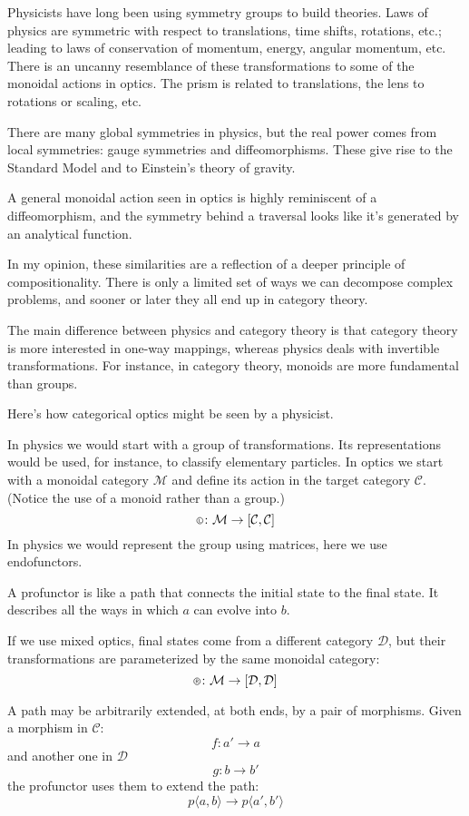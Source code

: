\documentclass[11pt]{amsart}
\newcommand*\circled[3]
  {\tikz[baseline={([yshift=#2]current bounding box.center)}]{
      \node[shape=circle,draw,inner sep=#1] (char) {#3};}}
\newcommand{\actL}{\mathbin{\circled{0.5pt}{-0.55ex}{\scalebox{0.75}{\tiny{$\mathsf{L}$}}}}}
\newcommand{\actR}{\mathbin{\circled{0.5pt}{-0.55ex}{\scalebox{0.75}{\tiny{$\mathsf{R}$}}}}}
\begin{document}
Physicists have long been using symmetry groups to build theories. Laws of physics are symmetric with respect to translations, time shifts, rotations, etc.; leading to laws of conservation of momentum, energy, angular momentum, etc. There is an uncanny resemblance of these transformations to some of the monoidal actions in optics. The prism is related to translations, the lens to rotations or scaling, etc.

There are many global symmetries in physics, but the real power comes from local symmetries: gauge symmetries and diffeomorphisms. These give rise to the Standard Model and to Einstein's theory of gravity. 

A general monoidal action seen in optics is highly reminiscent of a diffeomorphism, and the symmetry behind a traversal looks like it's generated by an analytical function.

In my opinion, these similarities are a reflection of a deeper principle of compositionality. There is only a limited set of ways we can decompose complex problems, and sooner or later they all end up in category theory. 

The main difference between physics and category theory is that category theory is more interested in one-way mappings, whereas physics deals with invertible transformations. For instance, in category theory, monoids are more fundamental than groups.

Here's how categorical optics might be seen by a physicist. 

In physics we would start with a group of transformations. Its representations would be used, for instance, to classify elementary particles. In optics we start with a monoidal category $\mathcal{M}$ and define its action in the target category $\mathcal{C}$. (Notice the use of a monoid rather than a group.) 
\[ \actL \colon \mathcal{M} \to [\mathcal{C}, \mathcal{C}] \]
In physics we would represent the group using matrices, here we use endofunctors.

A profunctor is like a path that connects the initial state to the final state. It describes all the ways in which $a$ can evolve into $b$. 

If we use mixed optics, final states come from a different category $\mathcal{D}$, but their transformations are parameterized by the same monoidal category:
\[ \actR \colon \mathcal{M} \to [\mathcal{D}, \mathcal{D}] \]

A path may be arbitrarily extended, at both ends, by a pair of morphisms. Given a morphism in $\mathcal{C}$:
\[ f \colon a' \to a \]
and another one in $\mathcal{D}$
\[g \colon b \to b' \]
the profunctor uses them to extend the path:
\[ p \langle a, b \rangle \to p \langle a', b' \rangle \]
\end{document}
